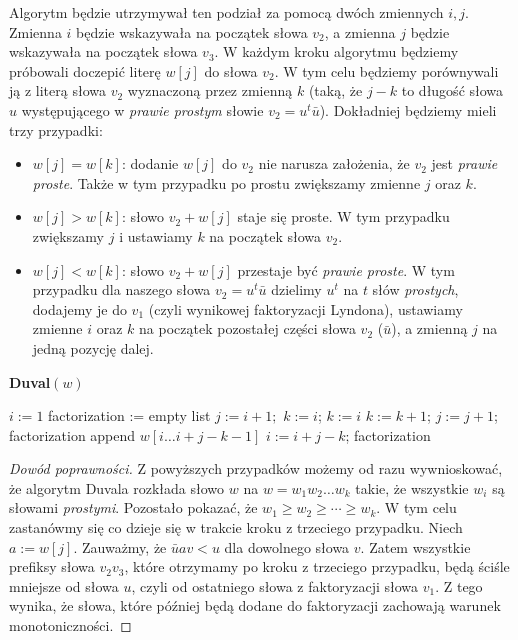 \documentclass{article}
\begin{document}
Algorytm będzie utrzymywał ten podział za pomocą dwóch zmiennych $i, j$. Zmienna $i$ będzie wskazywała na początek słowa $v_2$, a zmienna $j$ będzie wskazywała na początek słowa $v_3$. 
W każdym kroku algorytmu będziemy próbowali doczepić literę $w[j]$ do słowa $v_2$. W tym celu będziemy porównywali ją z literą słowa $v_2$ wyznaczoną przez zmienną $k$ (taką, że $j - k$ 
to długość słowa $u$ występującego w \textit{prawie prostym} słowie $v_2 = u^t\bar{u}$). 
Dokładniej będziemy mieli trzy przypadki:
\begin{itemize}
    \item $w[j] = w[k]$: dodanie $w[j]$ do $v_2$ nie narusza założenia, że $v_2$ jest \textit{prawie proste}. Także w tym przypadku po prostu zwiększamy zmienne $j$ oraz $k$.
    \item $w[j] > w[k]$: słowo $v_2 + w[j]$ staje się proste. W tym przypadku zwiększamy $j$ i ustawiamy $k$ na początek słowa $v_2$.
    \item $w[j] < w[k]$: słowo $v_2 + w[j]$ przestaje być \textit{prawie proste}. W tym przypadku dla naszego słowa $v_2 = u^t\bar{u}$ dzielimy $u^t$ na $t$ słów \textit{prostych},
    dodajemy je do $v_1$ (czyli wynikowej faktoryzacji Lyndona), ustawiamy zmienne $i$ oraz $k$ na początek pozostałej części słowa $v_2$ ($\bar{u}$), a zmienną $j$ na jedną pozycję dalej.
\end{itemize}





\begin{algorithm}[H]
    \caption{\textbf{Duval$(w)$}}
    \begin{algorithmic}
        \State $i := 1$
        \State factorization := empty list
            \State $j := i+1;$  $k := i$;
                    \State $k := i$
                \Else
                    \State $k := k + 1$;
                \EndIf
                \State $j := j + 1$;
            \EndWhile
                \State factorization append $w[i\ldots i+j-k-1]$
                \State $i := i + j - k$;
           \EndWhile
        \EndWhile
        \State \Return factorization
    \end{algorithmic}
\end{algorithm}

\begin{proof}[Dowód poprawności]
    Z powyższych przypadków możemy od razu wywnioskować, że algorytm Duvala rozkłada słowo $w$ na 
    $w = w_1w_2\ldots w_k$ takie, że wszystkie $w_i$ są słowami \textit{prostymi}.
    Pozostało pokazać, że $w_1 \geq w_2 \geq \cdots \geq w_k$. 
    W tym celu zastanówmy się co dzieje się w trakcie kroku z trzeciego przypadku. Niech $a := w[j]$. 
    Zauważmy, że $\bar{u}av < u$ dla 
    dowolnego słowa $v$. Zatem wszystkie prefiksy słowa $v_2v_3$, które otrzymamy po kroku z trzeciego przypadku,
    będą ściśle mniejsze od słowa $u$, czyli od ostatniego słowa z faktoryzacji słowa $v_1$. 
    Z tego wynika, że słowa, które później będą dodane do faktoryzacji zachowają warunek monotoniczności.
\end{proof}
\end{document}
